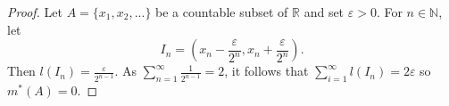 \documentclass[a4paper,11pt]{article}
\theoremstyle{plain}
\newtheorem{lemma}[theorem]{Lemma}
\theoremstyle{definition}
\begin{document}
\begin{proof} \citep[pp.~15-16]{SA}
Let $A = \{x_1,x_2,...\}$ be a countable subset of $\mathbb{R}$ and set $\varepsilon > 0$. For $n \in \mathbb{N}$, let
\[
I_n = \left(x_n - \frac{\varepsilon}{2^n}, x_n + \frac{\varepsilon}{2^n}\right).
\]
Then $l(I_n) = \frac{\varepsilon}{2^{n-1}}$. As $\sum_{n=1}^{\infty} \frac{1}{2^{n-1}} = 2$, it follows that $\sum_{i=1}^{\infty} l(I_n) = 2\varepsilon$ so $m^*(A) = 0$.%
\end{proof}

\end{document}
